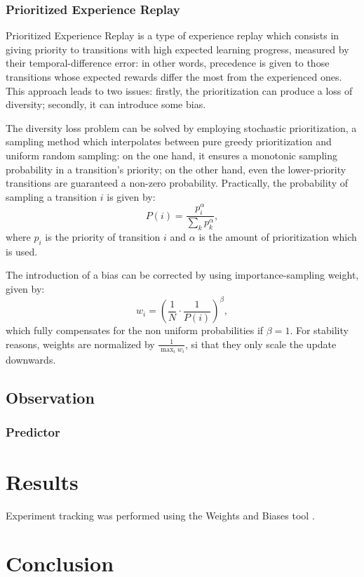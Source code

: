 \documentclass[a4paper, 12pt]{article}
\numberwithin{equation}{section}
\begin{document}
\subsubsection[Prioritized Experience Replay]{Prioritized Experience Replay \cite{prioritized-experience-replay}}
Prioritized Experience Replay is a type of experience replay which consists in giving priority to transitions with high expected learning progress, measured by their temporal-difference error: in other words, precedence is given to those transitions whose expected rewards differ the most from the experienced ones. This approach leads to two issues: firstly, the prioritization can produce a loss of diversity; secondly, it can introduce some bias.

The diversity loss problem can be solved by employing stochastic prioritization, a sampling method which interpolates between pure greedy prioritization and uniform random sampling: on the one hand, it ensures a monotonic sampling probability in a transition's priority; on the other hand, even the lower-priority transitions are guaranteed a non-zero probability. Practically, the probability of sampling a transition $i$ is given by:
\begin{equation}
	P\left(i\right)=\frac{p_i^\alpha}{\sum_kp_k^\alpha},
\end{equation}
where $p_i$ is the priority of transition $i$ and $\alpha$ is the amount of prioritization which is used.

The introduction of a bias can be corrected by using importance-sampling weight, given by:
\begin{equation}
	w_i=\left(\frac{1}{N}\cdot\frac{1}{P\left(i\right)}\right)^\beta,
\end{equation}
which fully compensates for the non uniform probabilities if $\beta=1$. For stability reasons, weights are normalized by $\frac{1}{\max_iw_i}$, si that they only scale the update downwards.


\subsection{Observation}

\subsubsection{Predictor}


\section{Results}

Experiment tracking was performed using the Weights and Biases tool \cite{wandb}.


\section{Conclusion}




















\clearpage
\printbibliography[heading=bibintoc]
\end{document}
